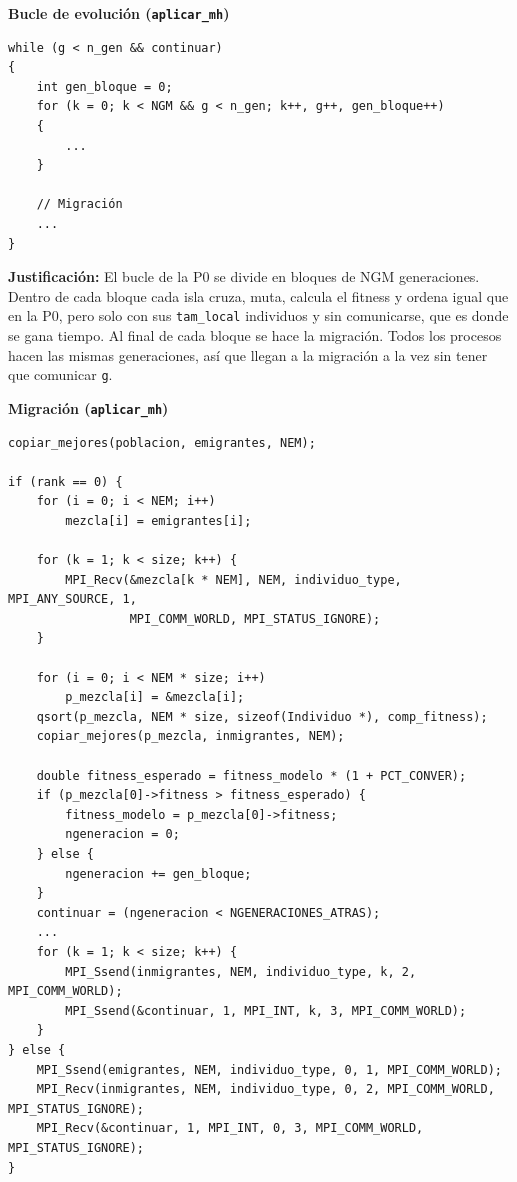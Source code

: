 \documentclass[12pt]{article}
\begin{document}
\begin{enumerate}
\vspace{0.5cm}


\medskip
\noindent\textbf{Bucle de evolución (\texttt{aplicar\_mh})}\par
\smallskip

\begin{lstlisting}[style=EstiloC]
while (g < n_gen && continuar)
{
	int gen_bloque = 0;
	for (k = 0; k < NGM && g < n_gen; k++, g++, gen_bloque++)
	{
		...
	}

	// Migración
	...
}
\end{lstlisting}

\textbf{Justificación:} El bucle de la P0 se divide en bloques de NGM generaciones. Dentro de cada bloque cada isla cruza, muta, calcula el fitness y ordena igual que en la P0, pero solo con sus \texttt{tam\_local} individuos y sin comunicarse, que es donde se gana tiempo. Al final de cada bloque se hace la migración. Todos los procesos hacen las mismas generaciones, así que llegan a la migración a la vez sin tener que comunicar \texttt{g}.

\vspace{0.5cm}


\medskip
\noindent\textbf{Migración (\texttt{aplicar\_mh})}\par
\smallskip

\begin{lstlisting}[style=EstiloC]
copiar_mejores(poblacion, emigrantes, NEM);

if (rank == 0) {
	for (i = 0; i < NEM; i++)
		mezcla[i] = emigrantes[i];

	for (k = 1; k < size; k++) {
		MPI_Recv(&mezcla[k * NEM], NEM, individuo_type, MPI_ANY_SOURCE, 1,
				 MPI_COMM_WORLD, MPI_STATUS_IGNORE);
	}

	for (i = 0; i < NEM * size; i++)
		p_mezcla[i] = &mezcla[i];
	qsort(p_mezcla, NEM * size, sizeof(Individuo *), comp_fitness);
	copiar_mejores(p_mezcla, inmigrantes, NEM);

	double fitness_esperado = fitness_modelo * (1 + PCT_CONVER);
	if (p_mezcla[0]->fitness > fitness_esperado) {
		fitness_modelo = p_mezcla[0]->fitness;
		ngeneracion = 0;
	} else {
		ngeneracion += gen_bloque;
	}
	continuar = (ngeneracion < NGENERACIONES_ATRAS);
	...
	for (k = 1; k < size; k++) {
		MPI_Ssend(inmigrantes, NEM, individuo_type, k, 2, MPI_COMM_WORLD);
		MPI_Ssend(&continuar, 1, MPI_INT, k, 3, MPI_COMM_WORLD);
	}
} else {
	MPI_Ssend(emigrantes, NEM, individuo_type, 0, 1, MPI_COMM_WORLD);
	MPI_Recv(inmigrantes, NEM, individuo_type, 0, 2, MPI_COMM_WORLD, MPI_STATUS_IGNORE);
	MPI_Recv(&continuar, 1, MPI_INT, 0, 3, MPI_COMM_WORLD, MPI_STATUS_IGNORE);
}


\end{lstlisting}
\end{enumerate}
\end{document}
